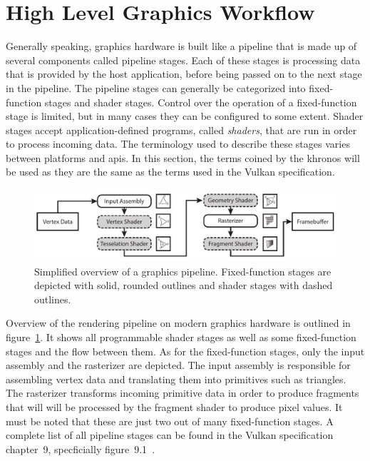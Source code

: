   \section{High Level Graphics Workflow}
    \label{sec:GraphicsWorkflow}
    Generally speaking, graphics hardware is built like a pipeline that is made up of several components called pipeline stages.
    Each of these stages is processing data that is provided by the host application, before being passed on to the next stage in the pipeline.
    The pipeline stages can generally be categorized into fixed-function stages and shader stages.
    Control over the operation of a fixed-function stage is limited, but in many cases they can be configured to some extent.
    Shader stages accept application-defined programs, called \textit{shaders}, that are run in order to process incoming data.
    The terminology used to describe these stages varies between platforms and \glspl{api}.
    In this section, the terms coined by the \gls{khronos} will be used as they are the same as the terms used in the Vulkan specification.

    \begin{figure}
      \includegraphics[width=\textwidth]{Main/Images/Rendering_Pipeline_Overview}
      \centering
      \caption{Simplified overview of a graphics pipeline. Fixed-function stages are depicted with solid, rounded outlines and shader stages with dashed outlines.}
      \label{fig:Rendering_Pipeline_Overview}
    \end{figure}

    Overview of the rendering pipeline on modern graphics hardware is outlined in figure~\ref{fig:Rendering_Pipeline_Overview}.
    It shows all programmable shader stages as well as some fixed-function stages and the flow between them.
    As for the fixed-function stages, only the input assembly and the rasterizer are depicted.
    The input assembly is responsible for assembling vertex data and translating them into primitives such as triangles.
    The rasterizer transforms incoming primitive data in order to produce fragments that will will be processed by the fragment shader to produce pixel values.
    It must be noted that these are just two out of many fixed-function stages.
    A complete list of all pipeline stages can be found in the Vulkan specification chapter~9, specficially figure~9.1~\cite{vkspec}.

